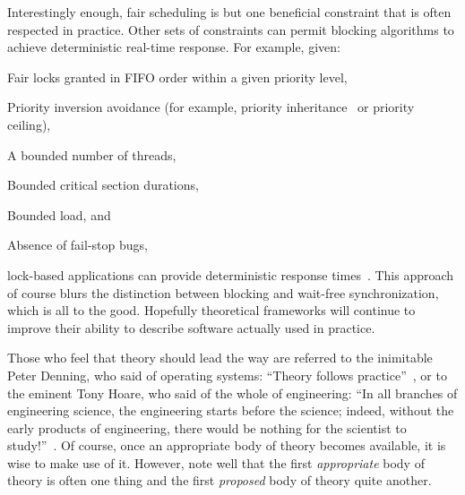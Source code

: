 Interestingly enough, fair scheduling is but one beneficial
constraint that is often respected in practice.
Other sets of constraints can permit blocking algorithms to
achieve deterministic real-time response.
For example, given:
\begin{enumerate*}[(1)]
\item Fair locks granted in FIFO order within a given priority level,
\item Priority inversion avoidance (for example, priority
inheritance~\cite{Takada:1995:RSN:527074.828566,Cai-DongWang1996PrioInherLock}
or priority ceiling),
\item A bounded number of threads,
\item Bounded critical section durations,
\item Bounded load,
and
\item Absence of fail-stop bugs,
\end{enumerate*}
lock-based applications can provide deterministic
response times~\cite{BjoernBrandenburgPhD,DipankarSarma2004OLSscalability}.
This approach of course blurs the distinction between blocking and wait-free
synchronization, which is all to the good.
Hopefully theoretical frameworks will continue to improve their ability
to describe software actually used in practice.

Those who feel that theory should lead the way are referred to the
inimitable Peter Denning, who said of operating systems:
``Theory follows practice''~\cite{Denning:2015:POF:2830903.2830904},
or to the eminent Tony Hoare, who said of the whole of engineering:
``In all branches of engineering science, the engineering starts before
the science; indeed, without the early products of engineering, there
would be nothing for the scientist to
study!''~\cite{RichardMorris2007TonyHoareInterview}.
Of course, once an appropriate body of theory becomes available, it is
wise to make use of it.
However, note well that the first \emph{appropriate} body of theory
is often one thing and the first \emph{proposed} body of theory quite
another.

